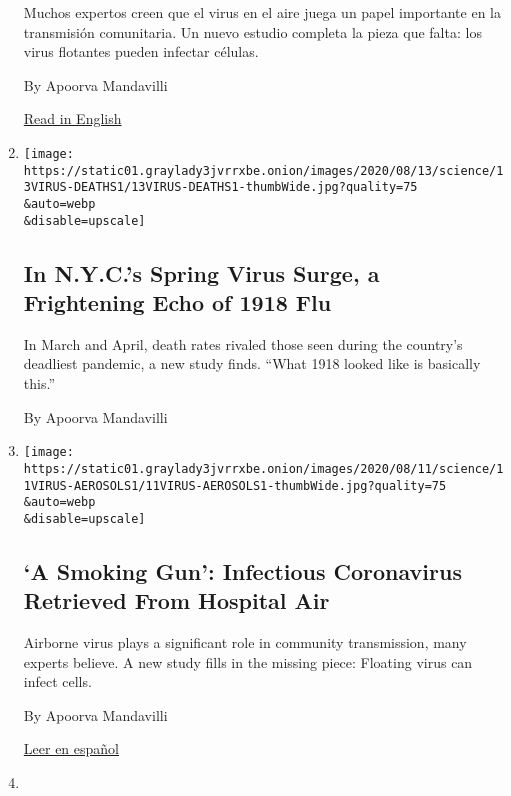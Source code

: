\begin{enumerate}
  Muchos expertos creen que el virus en el aire juega un papel
  importante en la transmisión comunitaria. Un nuevo estudio completa la
  pieza que falta: los virus flotantes pueden infectar células.

  By Apoorva Mandavilli

  \href{https://www.nytimes3xbfgragh.onion/2020/08/11/health/coronavirus-aerosols-indoors.html}{Read
  in English}
\item
  \href{/2020/08/13/health/coronavirus-flu-new-york.html}{}

  \texttt{[image: https://static01.graylady3jvrrxbe.onion/images/2020/08/13/science/13VIRUS-DEATHS1/13VIRUS-DEATHS1-thumbWide.jpg?quality=75\\\&auto=webp\\\&disable=upscale]}

  \hypertarget{in-nycs-spring-virus-surge-a-frightening-echo-of-1918-flu}{%
  \subsection{In N.Y.C.'s Spring Virus Surge, a Frightening Echo of 1918
  Flu}\label{in-nycs-spring-virus-surge-a-frightening-echo-of-1918-flu}}

  In March and April, death rates rivaled those seen during the
  country's deadliest pandemic, a new study finds. ``What 1918 looked
  like is basically this.''

  By Apoorva Mandavilli
\item
  \href{/2020/08/11/health/coronavirus-aerosols-indoors.html}{}

  \texttt{[image: https://static01.graylady3jvrrxbe.onion/images/2020/08/11/science/11VIRUS-AEROSOLS1/11VIRUS-AEROSOLS1-thumbWide.jpg?quality=75\\\&auto=webp\\\&disable=upscale]}

  \hypertarget{a-smoking-gun-infectious-coronavirus-retrieved-from-hospital-air}{%
  \subsection{`A Smoking Gun': Infectious Coronavirus Retrieved From
  Hospital
  Air}\label{a-smoking-gun-infectious-coronavirus-retrieved-from-hospital-air}}

  Airborne virus plays a significant role in community transmission,
  many experts believe. A new study fills in the missing piece: Floating
  virus can infect cells.

  By Apoorva Mandavilli

  \href{https://www.nytimes3xbfgragh.onion/es/2020/08/13/espanol/coronavirus-en-aire.html}{Leer
  en español}
\item
  \href{/2020/08/07/health/coronavirus-ny-schools-reopen.html}{}


\end{enumerate}
